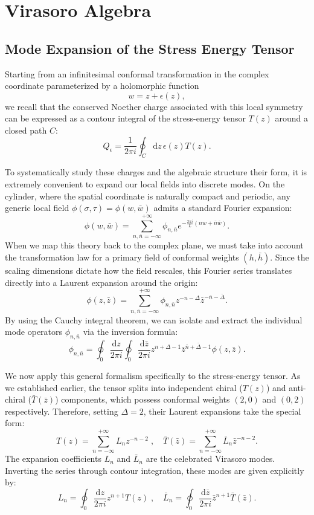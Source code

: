 \section{Virasoro Algebra}

\subsection{Mode Expansion of the Stress Energy Tensor}

Starting from an infinitesimal conformal transformation in the complex coordinate parameterized by a holomorphic function
\[
    w = z + \epsilon(z),
\]
we recall that the conserved Noether charge associated with this local symmetry can be expressed as a contour integral of the stress-energy tensor \(T(z)\) around a closed path \(C\):
\[
    Q_{\epsilon} = \frac{1}{2\pi i} \oint_C \mathrm{d}z \, \epsilon(z) T(z).
\]

To systematically study these charges and the algebraic structure their form, it is extremely convenient to expand our local fields into discrete modes. On the cylinder, where the spatial coordinate is naturally compact and periodic, any generic local field \(\phi(\sigma, \tau) = \phi(w, \bar{w})\) admits a standard Fourier expansion:
\[
    \phi(w, \bar{w}) = \sum_{n, \bar{n} = -\infty}^{+\infty} \phi_{n, \bar{n}} e^{-\frac{2\pi i}{L}(n w + \bar{n} \bar{w})}.
\]
When we map this theory back to the complex plane, we must take into account the transformation law for a primary field of conformal weights \((h, \bar{h})\). Since the scaling dimensions dictate how the field rescales, this Fourier series translates directly into a Laurent expansion around the origin:
\[
    \phi(z, \bar{z}) = \sum_{n, \bar{n} = -\infty}^{+\infty} \phi_{n, \bar{n}} z^{-n-\Delta} \bar{z}^{-\bar{n}-\bar{\Delta}}.
\]
By using the Cauchy integral theorem, we can isolate and extract the individual mode operators \(\phi_{n, \bar{n}}\) via the inversion formula:
\[
    \phi_{n, \bar{n}} = \oint_0 \frac{\mathrm{d}z}{2\pi i} \oint_0 \frac{\mathrm{d}\bar{z}}{2\pi i} z^{n+\Delta-1} \bar{z}^{\bar{n}+\bar{\Delta}-1} \phi(z, \bar{z}).
\]

We now apply this general formalism specifically to the stress-energy tensor. As we established earlier, the tensor splits into independent chiral (\(T(z)\)) and anti-chiral (\(\bar{T}(\bar{z})\)) components, which possess conformal weights \((2,0)\) and \((0,2)\) respectively. Therefore, setting \(\Delta = 2\), their Laurent expansions take the special form:
\[
    T(z) = \sum_{n=-\infty}^{+\infty} L_n z^{-n-2} \;, \quad \bar{T}(\bar{z}) = \sum_{n=-\infty}^{+\infty} \bar{L}_n \bar{z}^{-n-2}.
\]
The expansion coefficients \(L_n\) and \(\bar{L}_n\) are the celebrated Virasoro modes. Inverting the series through contour integration, these modes are given explicitly by:
\[
    L_n = \oint_0 \frac{\mathrm{d}z}{2\pi i} z^{n+1} T(z) \;, \quad \bar{L}_n = \oint_0 \frac{\mathrm{d}\bar{z}}{2\pi i} \bar{z}^{n+1} \bar{T}(\bar{z}).
\]

